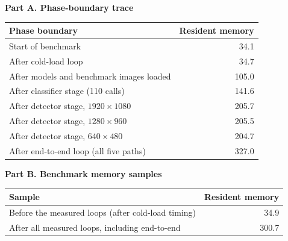 
\nopagebreak\noindent\textbf{Part A. Phase-boundary trace}

\begin{center}\footnotesize\setlength{\tabcolsep}{5pt}
\begin{tabular}{p{190pt} r}
\toprule
Phase boundary & Resident memory \\
\midrule
Start of benchmark                       & 34.1 \\
After cold-load loop                     & 34.7 \\
After models and benchmark images loaded & 105.0 \\
After classifier stage (110 calls)       & 141.6 \\
After detector stage, $1920\times1080$   & 205.7 \\
After detector stage, $1280\times960$    & 205.5 \\
After detector stage, $640\times480$     & 204.7 \\
After end-to-end loop (all five paths)   & 327.0 \\
\bottomrule
\end{tabular}\end{center}

\medskip
\noindent\textbf{Part B. Benchmark memory samples}

\begin{center}\footnotesize\setlength{\tabcolsep}{5pt}
\begin{tabular}{p{190pt} r}
\toprule
Sample & Resident memory \\
\midrule
Before the measured loops (after cold-load timing) & 34.9 \\
After all measured loops, including end-to-end     & 300.7 \\
\bottomrule
\end{tabular}\end{center}


